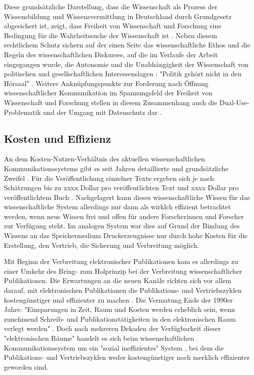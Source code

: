 Diese grundsätzliche Darstellung, dass die Wissenschaft als Prozess der Wissensbildung und Wissensvermittlung in Deutschland durch Grundgesetz abgesichert ist, zeigt, dass Freiheit von Wissenschaft und Forschung eine Bedingung für die Wahrheitssuche der Wissenschaft ist \cite{Oezmen_2015}. Neben diesem rechtlichem Schutz sichern auf der einen Seite das wissenschaftliche Ethos und die Regeln des wissenschaftlichen Diskurses, auf die im Verlaufe der Arbeit eingegangen wurde, die Autonomie und die Unabhängigkeit der Wissenschaft von politischen und gesellschaftlichen Interessenslagen \cite{Oezmen_2015}: "Politik gehört nicht in den Hörsaal" \cite[:494]{Weber_1992}. Weitere Anknüpfungspunkte zur Forderung nach Öffnung wissenschaftlicher Kommunikation im Spannungsfeld der Freiheit von Wissenschaft und Forschung stellen in diesem Zusammenhang auch die Dual-Use-Problematik und der Umgang mit Datenschutz dar \cite{Fritsch_2015}.

\subsection{Kosten und Effizienz}

An dem Kosten-Nutzen-Verhältnis des aktuellen wissenschaftlichen Kommunikationssystems gibt es seit Jahren detaillierte und grundsätzliche Zweifel \cite{suchen}. Für die Veröffentlichung einzelner Texte ergeben sich je nach Schätzungen bis zu xxxx Dollar pro veröffentlichten Text und xxxx Dollar pro veröffentlichtem Buch \cite{suchen}. Nachgelagert kann dieses wissenschaftliche Wissen für das wissenschaftliche System allerdings nur dann als wirklch effizient betrachtet werden, wenn neus Wissen frei und offen für andere Forscherinnen und Forscher zur Verfügung steht. Im analogen System war dies auf Grund der Bindung des Wissens an das Speichermedium Druckerzeugnisse nur durch hohe Kosten für die Erstellung, den Vertrieb, die Sicherung und Verbreitung möglich.

Mit Beginn der Verbreitung elektronischer Publikationen kam es allerdings zu einer Umkehr des Bring- zum Holprinzip bei der Verbreitung wissenschaftlicher Publikationen. Die Erwartungen an die neuen Kanäle richten sich vor allem darauf, mit elektronischen Publikationen die Publikations- und Vertriebszyklen kostengünstiger und effizienter zu machen \cite{Brueggemann-Klein_1995}. Die Vermutung Ende der 1990er Jahre: "Einsparungen in Zeit, Raum und Kosten werden erheblich sein, wenn zunehmend Schreib- und Publikationstätigkeiten in den elektronischen Raum verlegt werden" \cite{roberts_1999_scholarly}. Doch nach mehreren Dekaden der Verfügbarkeit dieser "elektronischen Räume" handelt es sich beim wissenschaftlichen Kommunikationssystem um ein "sozial ineffizientes" System \cite[:47]{mueller-langer_2010}, bei dem die Publikations- und Vertriebszyklen weder kostengünstiger noch merklich effizienter geworden sind.

